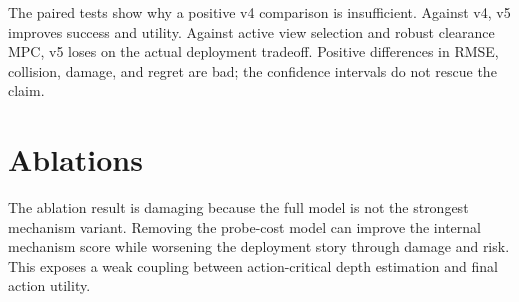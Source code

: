 \documentclass{article}
\begin{document}
The paired tests show why a positive v4 comparison is insufficient. Against v4, v5 improves success and utility. Against active view selection and robust clearance MPC, v5 loses on the actual deployment tradeoff. Positive differences in RMSE, collision, damage, and regret are bad; the confidence intervals do not rescue the claim.

\section{Ablations}

\begin{table}[t]
\centering
\scriptsize
{}
\caption{Ablation audit. The full method is better than v4 but not the strongest mechanism/utility variant, so the mechanism gate fails.}
\label{tab:ablation}
\end{table}


The ablation result is damaging because the full model is not the strongest mechanism variant. Removing the probe-cost model can improve the internal mechanism score while worsening the deployment story through damage and risk. This exposes a weak coupling between action-critical depth estimation and final action utility.
\end{document}
